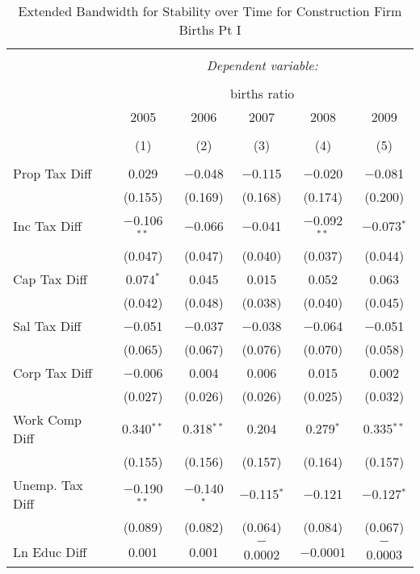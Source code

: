 
\begin{table}[!htbp] \centering 
  \caption{Extended Bandwidth for Stability over Time for  Construction Firm Births Pt I} 
  \label{23year_eb} 
\small 
\begin{tabular}{@{\extracolsep{5pt}}lccccc} 
\\[-1.8ex]\hline 
\hline \\[-1.8ex] 
 & \multicolumn{5}{c}{\textit{Dependent variable:}} \\ 
\cline{2-6} 
\\[-1.8ex] & \multicolumn{5}{c}{births ratio} \\ 
 & 2005 & 2006 & 2007 & 2008 & 2009 \\ 
\\[-1.8ex] & (1) & (2) & (3) & (4) & (5)\\ 
\hline \\[-1.8ex] 
 Prop Tax Diff & 0.029 & $-$0.048 & $-$0.115 & $-$0.020 & $-$0.081 \\ 
  & (0.155) & (0.169) & (0.168) & (0.174) & (0.200) \\ 
  Inc Tax Diff & $-$0.106$^{**}$ & $-$0.066 & $-$0.041 & $-$0.092$^{**}$ & $-$0.073$^{*}$ \\ 
  & (0.047) & (0.047) & (0.040) & (0.037) & (0.044) \\ 
  Cap Tax Diff & 0.074$^{*}$ & 0.045 & 0.015 & 0.052 & 0.063 \\ 
  & (0.042) & (0.048) & (0.038) & (0.040) & (0.045) \\ 
  Sal Tax Diff & $-$0.051 & $-$0.037 & $-$0.038 & $-$0.064 & $-$0.051 \\ 
  & (0.065) & (0.067) & (0.076) & (0.070) & (0.058) \\ 
  Corp Tax Diff & $-$0.006 & 0.004 & 0.006 & 0.015 & 0.002 \\ 
  & (0.027) & (0.026) & (0.026) & (0.025) & (0.032) \\ 
  Work Comp Diff & 0.340$^{**}$ & 0.318$^{**}$ & 0.204 & 0.279$^{*}$ & 0.335$^{**}$ \\ 
  & (0.155) & (0.156) & (0.157) & (0.164) & (0.157) \\ 
  Unemp. Tax Diff & $-$0.190$^{**}$ & $-$0.140$^{*}$ & $-$0.115$^{*}$ & $-$0.121 & $-$0.127$^{*}$ \\ 
  & (0.089) & (0.082) & (0.064) & (0.084) & (0.067) \\ 
  Ln Educ Diff & 0.001 & 0.001 & $-$0.0002 & $-$0.0001 & $-$0.0003 \\ 

\end{tabular}
\end{table}
